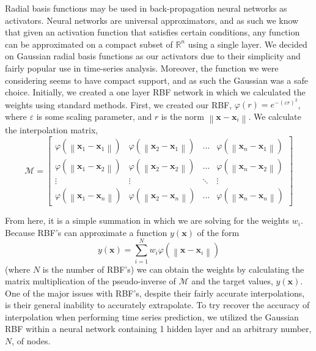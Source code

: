 \documentclass[12pt]{article}
\begin{document}
    Radial basis functions may be used in back-propagation neural networks as activators. Neural networks are universal approximators, and as such we know that given an activation function that satisfies certain conditions, any function can be approximated on a compact subset of $\mathbb{R}^n$ using a single layer. We decided on Gaussian radial basis functions as our activators due to their simplicity and fairly popular use in time-series analysis. Moreover, the function we were considering seems to have compact support, and as such the Gaussian was a safe choice. Initially, we created a one layer RBF network in which we calculated the weights using standard methods. First, we created our RBF, $\varphi(r)=e^{-(\varepsilon r)^{2}}$, where $\varepsilon$ is some scaling parameter, and $r$ is the norm  $\left\|\mathbf{x}-\mathbf{x}_{i}\right\|$. We calculate the interpolation matrix, 
$$\mathcal{M}=
 \left[ \begin{array}{cccc}{\varphi\left(\left\|\mathbf{x}_{1}-\mathbf{x}_{1}\right\|\right)} & {\varphi\left(\left\|\mathbf{x}_{2}-\mathbf{x}_{1}\right\|\right)} & {\dots} & {\varphi\left(\left\|\mathbf{x}_{n}-\mathbf{x}_{1}\right\|\right)} \\ {\varphi\left(\left\|\mathbf{x}_{1}-\mathbf{x}_{2}\right\|\right)} & {\varphi\left(\left\|\mathbf{x}_{2}-\mathbf{x}_{2}\right\|\right)} & {\dots} & {\varphi\left(\left\|\mathbf{x}_{n}-\mathbf{x}_{2}\right\|\right)} \\ {\vdots} & {\vdots} & {\ddots} & {\vdots} \\ {\varphi\left(\left\|\mathbf{x}_{1}-\mathbf{x}_{n}\right\|\right)} & {\varphi\left(\left\|\mathbf{x}_{2}-\mathbf{x}_{n}\right\|\right)} & {\dots} & {\varphi\left(\left\|\mathbf{x}_{n}-\mathbf{x}_{n}\right\|\right)}\end{array}\right]$$

From here, it is a simple summation in which we are solving for the weights $w_i$. Because RBF’s can approximate a function $y(\mathbf{x})$ of the form  $$y(\mathbf{x})=\sum_{i=1}^{N} w_{i} \varphi\left(\left\|\mathbf{x}-\mathbf{x}_{i}\right\|\right)$$ (where $N$ is the number of RBF’s) we can obtain the weights by calculating the matrix multiplication of the pseudo-inverse of $\mathcal{M}$ and the target values, $y(\mathbf{x}).$ One of the major issues with RBF’s, despite their fairly accurate interpolations, is their general inability to accurately extrapolate. 
    To try recover the accuracy of interpolation when performing time series prediction, we utilized the Gaussian RBF within a neural network containing 1 hidden layer and an arbitrary number, $N$, of nodes.
\end{document}
